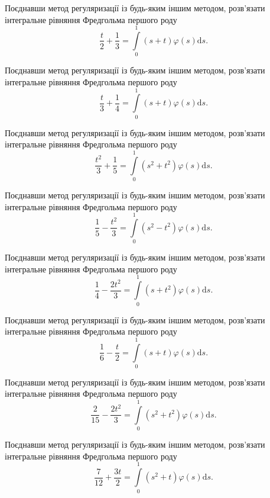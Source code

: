 \documentclass[12pt]{extarticle}
\begin{document}
\begin{Exercise}
Поєднавши метод регуляризації із будь-яким іншим методом, розв’язати інтегральне рівняння Фредгольма першого роду \[\dfrac{t}{2}+\dfrac{1}{3} = \int\limits_{0}^{1} \left(s + t\right) \varphi(s) \mathrm{d}s.\]
\end{Exercise}

\begin{Exercise}
Поєднавши метод регуляризації із будь-яким іншим методом, розв’язати інтегральне рівняння Фредгольма першого роду \[\dfrac{t}{3}+\dfrac{1}{4} = \int\limits_{0}^{1} \left(s + t\right) \varphi(s) \mathrm{d}s.\]
\end{Exercise}

\begin{Exercise}
Поєднавши метод регуляризації із будь-яким іншим методом, розв’язати інтегральне рівняння Фредгольма першого роду \[\dfrac{t^2}{3}+\dfrac{1}{5} = \int\limits_{0}^{1} \left(s^2 + t^2\right) \varphi(s) \mathrm{d}s.\]
\end{Exercise}

\begin{Exercise}
Поєднавши метод регуляризації із будь-яким іншим методом, розв’язати інтегральне рівняння Фредгольма першого роду \[\dfrac{1}{5} - \dfrac{t^2}{3} = \int\limits_{0}^{1} \left(s^2 - t^2\right) \varphi(s) \mathrm{d}s.\]
\end{Exercise}

\begin{Exercise}
Поєднавши метод регуляризації із будь-яким іншим методом, розв’язати інтегральне рівняння Фредгольма першого роду \[\dfrac{1}{4}-\dfrac{2t^2}{3} = \int\limits_{0}^{1} \left(s + t^2\right) \varphi(s) \mathrm{d}s.\]
\end{Exercise}

\begin{Exercise}
Поєднавши метод регуляризації із будь-яким іншим методом, розв’язати інтегральне рівняння Фредгольма першого роду \[\dfrac{1}{6}-\dfrac{t}{2} = \int\limits_{0}^{1} \left(s + t\right) \varphi(s) \mathrm{d}s.\]
\end{Exercise}

\begin{Exercise}
Поєднавши метод регуляризації із будь-яким іншим методом, розв’язати інтегральне рівняння Фредгольма першого роду \[\dfrac{2}{15}-\dfrac{2t^2}{3} = \int\limits_{0}^{1} \left(s^2 + t^2\right) \varphi(s) \mathrm{d}s.\]
\end{Exercise}

\begin{Exercise}
Поєднавши метод регуляризації із будь-яким іншим методом, розв’язати інтегральне рівняння Фредгольма першого роду \[\dfrac{7}{12}+\dfrac{3t}{2} = \int\limits_{0}^{1} \left(s^2 + t\right) \varphi(s) \mathrm{d}s.\]
\end{Exercise}
\end{document}
